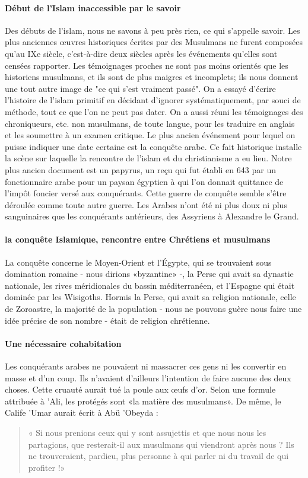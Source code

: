\paragraph{Début de l'Islam inaccessible par le savoir}
Des débuts de l'islam, nous ne savons à peu près rien, ce qui s'appelle savoir. Les plus anciennes œuvres historiques écrites par des Musulmans ne furent composées qu'au IXe siècle, c'est-à-dire deux siècles après les événements qu'elles sont censées rapporter. Les témoignages proches ne sont pas moins orientés que les historiens musulmans, et ils sont de plus maigres et incomplets; ils nous donnent une tout autre image de "ce qui s'est vraiment passé". On a essayé d'écrire l'histoire de l'islam primitif en décidant d'ignorer systématiquement, par souci de méthode, tout ce que l'on ne peut pas dater. 
On a aussi réuni les témoignages des chroniqueurs, etc. non musulmans, de toute langue, pour les traduire en anglais et les soumettre à un examen critique.
Le plus ancien événement pour lequel on puisse indiquer une date certaine est la conquête arabe. Ce fait historique installe la scène sur laquelle la rencontre de l'islam et du christianisme a eu lieu. Notre plus ancien document est un papyrus, un reçu qui fut établi en 643 par un fonctionnaire arabe pour un paysan égyptien à qui l'on donnait quittance de l'impôt foncier versé aux conquérants. Cette guerre de conquête semble s'être déroulée comme toute autre guerre. Les Arabes n'ont été ni plus doux ni plus sanguinaires que les conquérants antérieurs, des Assyriens à Alexandre le Grand.

\paragraph{la conquête Islamique, rencontre entre Chrétiens et musulmans}
La conquête concerne le Moyen-Orient et l'Égypte, qui se trouvaient sous domination romaine - nous dirions «byzantine» -, la Perse qui avait sa dynastie nationale, les rives méridionales du bassin méditerranéen, et l'Espagne qui était dominée par les Wisigoths. Hormis la Perse, qui avait sa religion nationale, celle de Zoroastre, la majorité de la population - nous ne pouvons guère nous faire une idée précise de son nombre - était de religion chrétienne.
\paragraph{Une nécessaire cohabitation}Les conquérants arabes ne pouvaient ni massacrer ces gens ni les convertir en masse et d'un coup. Ils n'avaient d'ailleurs l'intention de faire aucune des deux choses. Cette cruauté aurait tué la poule aux œufs d'or. Selon une formule attribuée à 'Ali, les protégés sont «la matière des musulmans». De même, le Calife 'Umar aurait écrit à Abü 'Obeyda : \begin{quote}
    « Si nous prenions ceux qui y sont assujettis et que nous nous les partagions, que resterait-il aux musulmans qui viendront après nous ? Ils ne trouveraient, pardieu, plus personne à qui parler ni du travail de qui profiter !»
\end{quote} 


